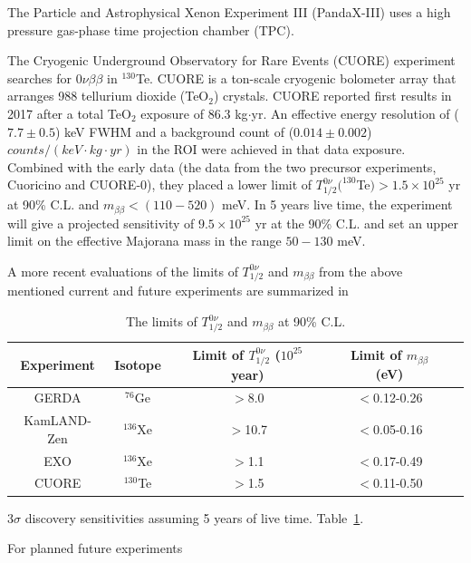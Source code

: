 The Particle and Astrophysical Xenon Experiment III (PandaX-III) uses a high pressure gas-phase time projection chamber (TPC).

The Cryogenic Underground Observatory for Rare Events (CUORE) experiment searches for $0\nu\beta\beta$ in $^{130}$Te. CUORE is a ton-scale cryogenic bolometer array that arranges 988 tellurium dioxide (TeO$_2$) crystals. CUORE reported first results in 2017 after a total TeO$_2$ exposure of 86.3 kg$\cdot$yr. An effective energy resolution of ($7.7\pm 0.5$) keV FWHM and a background count of ($0.014\pm0.002$) $counts/(keV\cdot kg\cdot yr)$ in the ROI were achieved in that data exposure. Combined with the early data (the data from the two precursor experiments, Cuoricino and CUORE-0), they placed a lower limit of $T^{0\nu}_{1/2}(^{130}$Te$)>1.5\times 10^{25}$ yr at 90\% C.L. and $m_{\beta\beta}<(110-520)$ meV\cite{alduino2018first}. In 5 years live time, the experiment will give a projected sensitivity of $9.5\times 10^{25}$ yr at the 90\% C.L. and set an upper limit on the effective Majorana mass in the range $50-130$ meV\cite{piperno2015dark}.

A more recent evaluations of the limits of $T^{0\nu}_{1/2}$ and $m_{\beta\beta}$ from the above mentioned
current and future experiments are summarized in

\begin{table}[ht]
	\caption{\label{gerdatable} The limits of $T^{0\nu}_{1/2}$ and $m_{\beta\beta}$ at 90\% C.L.}	
	{\centering
		\begin{tabular*}{135mm}{c@{\extracolsep{\fill}}cccc}
			\toprule 
			Experiment & Isotope & Limit of $T^{0\nu}_{1/2}$ ($10^{25}$ year) & Limit of $m_{\beta\beta}$ (eV)\\
			\midrule
			GERDA       & $^{76}$Ge & $>$8.0 & $<$0.12-0.26  \\	
			KamLAND-Zen & $^{136}$Xe & $>$10.7 & $<$0.05-0.16	\\
			EXO         & $^{136}$Xe & $>$1.1 & $<$0.17-0.49  \\	
			CUORE       & $^{130}$Te & $>$1.5 &  $<$0.11-0.50 \\	
			\bottomrule	
		\end{tabular*}
	}
\end{table}
\vspace{1cm}

3$\sigma$ discovery sensitivities assuming 5 years of live time.
 Table~\ref{gerdatable}\cite{agostini2017discovery,agostini2019probing}.
 
 
For planned future experiments 

